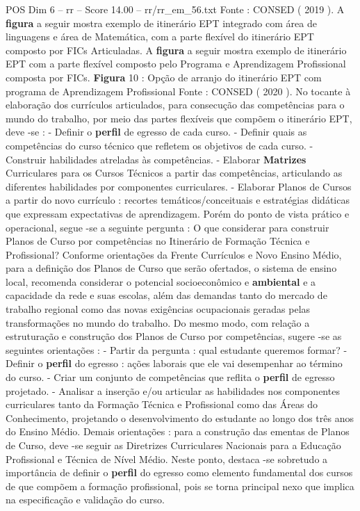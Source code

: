 \begin{textsample}{POS Dim 6 – rr – Score 14.00 – rr/rr\_em\_56.txt}
Fonte : CONSED ( 2019 ).
A \textbf{figura} a seguir mostra exemplo de itinerário EPT integrado com área de linguagens e área de Matemática, com a parte flexível do itinerário EPT composto por FICs Articuladas.
A \textbf{figura} a seguir mostra exemplo de itinerário EPT com a parte flexível composto pelo Programa e Aprendizagem Profissional composta por FICs. \textbf{Figura} 10 : Opção de arranjo do itinerário EPT com programa de Aprendizagem Profissional Fonte : CONSED ( 2020 ).
No tocante à elaboração dos currículos articulados, para consecução das competências para o mundo do trabalho, por meio das partes flexíveis que compõem o itinerário EPT, deve -se : - Definir o \textbf{perfil} de egresso de cada curso. - Definir quais as competências do curso técnico que refletem os objetivos de cada curso. - Construir habilidades atreladas às competências. - Elaborar \textbf{Matrizes} Curriculares para os Cursos Técnicos a partir das competências, articulando as diferentes habilidades por componentes curriculares. - Elaborar Planos de Cursos a partir do novo currículo : recortes temáticos/conceituais e estratégias didáticas que expressam expectativas de aprendizagem.
Porém do ponto de vista prático e operacional, segue -se a seguinte pergunta : O que considerar para construir Planos de Curso por competências no Itinerário de Formação Técnica e Profissional?
Conforme orientações da Frente Currículos e Novo Ensino Médio, para a definição dos Planos de Curso que serão ofertados, o sistema de ensino local, recomenda considerar o potencial socioeconômico e \textbf{ambiental} e a capacidade da rede e suas escolas, além das demandas tanto do mercado de trabalho regional como das novas exigências ocupacionais geradas pelas transformações no mundo do trabalho.
Do mesmo modo, com relação a estruturação e construção dos Planos de Curso por competências, sugere -se as seguintes orientações : - Partir da pergunta : qual estudante queremos formar? - Definir o \textbf{perfil} do egresso : ações laborais que ele vai desempenhar ao término do curso. - Criar um conjunto de competências que reflita o \textbf{perfil} de egresso projetado. - Analisar a inserção e/ou articular as habilidades nos componentes curriculares tanto da Formação Técnica e Profissional como das Áreas do Conhecimento, projetando o desenvolvimento do estudante ao longo dos três anos do Ensino Médio.
Demais orientações : para a construção das ementas de Planos de Curso, deve -se seguir as Diretrizes Curriculares Nacionais para a Educação Profissional e Técnica de Nível Médio.
Neste ponto, destaca -se sobretudo a importância de definir o \textbf{perfil} do egresso como elemento fundamental dos cursos de que compõem a formação profissional, pois se torna principal nexo que implica na especificação e validação do curso.

\end{textsample}
